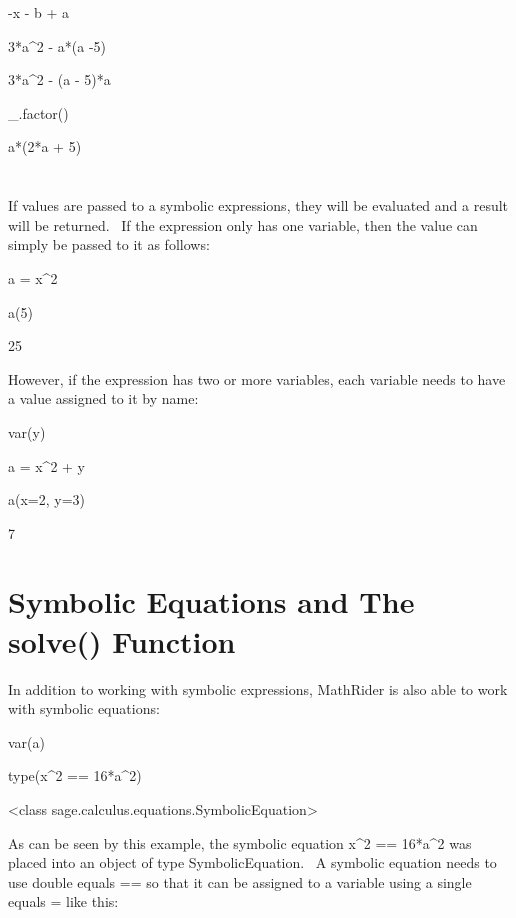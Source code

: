 \documentclass[12pt,twoside]{book}
\begin{document}
{\textbar}

{}-x {}- b + a

3*a\^{}2 {}- a*(a {}-5)

{\textbar}

3*a\^{}2 {}- (a {}- 5)*a

\_.factor()

{\textbar}

a*(2*a + 5)

\section[Passing Values To Symbolic Expressions]{
}

If values are passed to a symbolic expressions, they will be evaluated
and a result will be returned. \ If the expression only has one
variable, then the value can simply be passed to it as follows:


\bigskip

a = x\^{}2

a(5)

{\textbar}

25

However, if the expression has two or more variables, each variable
needs to have a value assigned to it by name:


\bigskip

var({\textquotesingle}y{\textquotesingle})

a = x\^{}2 + y

a(x=2, y=3)

{\textbar}

7

\section[Symbolic Equations and The solve() Function]{Symbolic Equations and The solve() Function}
In addition to working with symbolic expressions, MathRider is also able
to work with symbolic equations:


\bigskip

var({\textquotesingle}a{\textquotesingle})

type(x\^{}2 == 16*a\^{}2)

{\textbar}

{\textless}class
{\textquotesingle}sage.calculus.equations.SymbolicEquation{\textquotesingle}{\textgreater}

As can be seen by this example, the symbolic equation x\^{}2 ==
16*a\^{}2 was placed into an object of type SymbolicEquation. \ A
symbolic equation needs to use double equals
{\textquotesingle}=={\textquotesingle} so that it can be assigned to a
variable using a single equals {\textquotesingle}={\textquotesingle}
like this:
\end{document}
